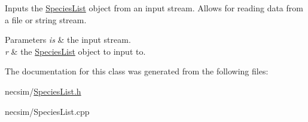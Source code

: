 Inputs the \hyperlink{class_species_list}{Species\+List} object from an input stream. Allows for reading data from a file or string stream. 


\begin{DoxyParams}{Parameters}
{\em is} & the input stream. \\
\hline
{\em r} & the \hyperlink{class_species_list}{Species\+List} object to input to. \\
\hline
\end{DoxyParams}


The documentation for this class was generated from the following files\+:\begin{DoxyCompactItemize}
\item 
necsim/\hyperlink{_species_list_8h}{Species\+List.\+h}\item 
necsim/Species\+List.\+cpp\end{DoxyCompactItemize}
